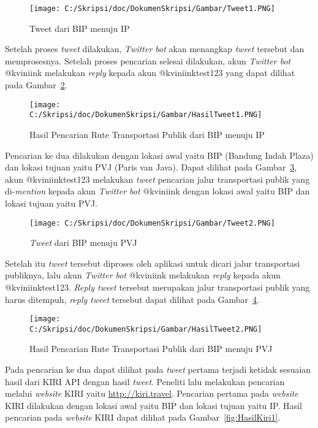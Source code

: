 \begin{enumerate}
	\begin{figure}
		\centering
			\texttt{[image: C:/Skripsi/doc/DokumenSkripsi/Gambar/Tweet1.PNG]}
		\caption{Tweet dari BIP menuju IP}
		\label{fig:Tweet1}
	\end{figure}
	
	Setelah proses \textit{tweet} dilakukan, \textit{Twitter bot} akan menangkap \textit{tweet} tersebut dan memprosesnya. Setelah proses pencarian selesai dilakukan, akun \textit{Twitter bot} @kviniink melakukan \textit{reply} kepada akun @kviniinktest123 yang dapat dilihat pada Gambar~\ref{fig:HasilTweet1}. 
	
		
	\begin{figure}
		\centering
			\texttt{[image: C:/Skripsi/doc/DokumenSkripsi/Gambar/HasilTweet1.PNG]}
		\caption{Hasil Pencarian Rute Transportasi Publik dari BIP menuju IP}
		\label{fig:HasilTweet1}
	\end{figure}
	
	Pencarian ke dua dilakukan dengan lokasi awal yaitu BIP (Bandung Indah Plaza) dan lokasi tujuan yaitu PVJ (Paris van Java). Dapat dilihat pada Gambar~\ref{fig:Tweet2}, akun @kviniinktest123 melakukan \textit{tweet} pencarian jalur transportasi publik yang di-\textit{mention} kepada akun \textit{Twitter bot} @kviniink dengan lokasi awal yaitu BIP dan lokasi tujuan yaitu PVJ.
	
	\begin{figure}
		\centering
			\texttt{[image: C:/Skripsi/doc/DokumenSkripsi/Gambar/Tweet2.PNG]}
		\caption{\textit{Tweet} dari BIP menuju PVJ}
		\label{fig:Tweet2}
	\end{figure}
	
	Setelah itu \textit{tweet} tersebut diproses oleh aplikasi untuk dicari jalur transportasi publiknya, lalu akun \textit{Twitter bot} @kviniink melakukan \textit{reply} kepada akun @kviniinktest123. \textit{Reply tweet} tersebut merupakan jalur transportasi publik yang harus ditempuh, \textit{reply tweet} tersebut dapat dilihat pada Gambar~\ref{fig:HasilTweet2}.
	
	
	\begin{figure}
		\centering
			\texttt{[image: C:/Skripsi/doc/DokumenSkripsi/Gambar/HasilTweet2.PNG]}
		\caption{Hasil Pencarian Rute Transportasi Publik dari BIP menuju PVJ}
		\label{fig:HasilTweet2}
	\end{figure}
	
	Pada pencarian ke dua dapat dilihat pada \textit{tweet} pertama terjadi ketidak sesuaian hasil dari KIRI API dengan hasil \textit{tweet}.
	Peneliti lalu melakukan pencarian melalui \textit{website} KIRI yaitu \url{http://kiri.travel}. Pencarian pertama pada \textit{website} KIRI dilakukan dengan lokasi awal yaitu BIP dan lokasi tujuan yaitu IP. Hasil pencarian pada \textit{website} KIRI dapat dilihat pada Gambar~\ref{fig:HasilKiri1}.
	

\end{enumerate}
